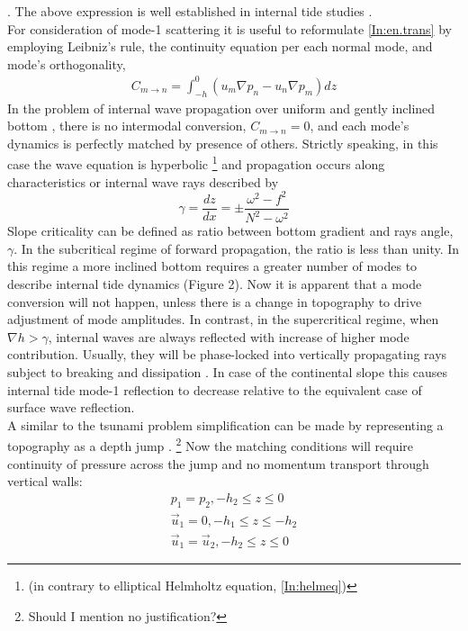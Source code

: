 \documentclass[12pt]{article}
\begin{document}
\citep{kelly2012cascade}. The above expression is well established in internal tide studies 
\citep{kurapov2003m, llewellyn2002conversion, pickering2015structure}.\\
For consideration of mode-1 scattering it is useful to reformulate \eqref{In:en.trans} by employing 
Leibniz's rule, the continuity equation per each normal mode, and mode's orthogonality,
\begin{align}
\label{In:bc_bc}
C_{m \to n} = \int_{-h}^{0} (u_m \nabla p_n - u_n \nabla p_m) dz
\end{align}
In the problem of internal wave propagation over uniform and gently inclined bottom 
\citep{wunsch1968propagation}, there is no intermodal conversion, $C_{m \to n} = 0$, and each 
mode's dynamics is perfectly matched by presence of others. Strictly speaking, in this case the 
wave equation is hyperbolic \footnote{(in contrary to elliptical Helmholtz equation, 
\eqref{In:helmeq})} and propagation occurs along characteristics \citep{sandstrom1969effect} or 
internal wave rays described by
\begin{equation}
\label{In:ch.angle}
\gamma = \frac{dz}{dx} = \pm \frac{\omega^2 - f^2}{N^2 - \omega^2}
\end{equation}
Slope criticality can be defined as ratio between bottom gradient and rays angle, $\gamma$. In 
the subcritical regime of forward propagation, the ratio is less than unity. In this regime a 
more inclined bottom requires a greater number of modes to describe internal tide dynamics (Figure 
2). Now it is apparent that a mode conversion will not happen, unless there is a change in 
topography to drive adjustment of mode amplitudes. In contrast, in the supercritical regime, when 
$\nabla h > \gamma$, internal waves are always reflected with increase of higher mode contribution. 
Usually, they will be phase-locked into vertically propagating rays \citep{garrett2007internal, 
lamb2014internal} subject to breaking and dissipation \citep{lien2001observations, 
nash2004internal, klymak2011breaking}. In case of the continental slope this causes internal tide 
mode-1 reflection to decrease relative to the equivalent case of surface wave reflection.\\
A similar to the tsunami problem simplification can be made by representing a topography as a depth 
jump \citep{st2002role, larsen1969internal, chapman1981scattering}. \footnote{Should I mention no 
justification?} Now the matching conditions will require continuity of pressure across the 
jump and no momentum transport through vertical walls:
\begin{align}
p_1 = p_2, -h_2 \leq z \leq 0 \\
\vec{u}_1 = 0, -h_1 \leq z \leq -h_2\\
\vec{u}_1 = \vec{u}_2, -h_2 \leq z \leq 0
\end{align}
\end{document}
